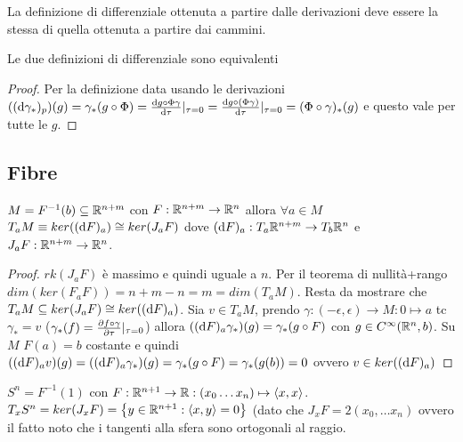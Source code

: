 La definizione di differenziale ottenuta a partire dalle
derivazioni deve essere la stessa di quella ottenuta a partire dai
cammini. 
\begin{obs}
    Le due definizioni di differenziale sono equivalenti
\end{obs}
\begin{proof}
    Per la definizione data usando le derivazioni
    $((\dd{\gamma_*})_{p})(g)=\gamma_*(g\circ\Phi)=
    \dv{g\circ\Phi\gamma}{\tau}|_{\tau=0}=
    \dv{g\circ(\Phi\gamma)}{\tau}|_{\tau=0}=(\Phi\circ\gamma)_*(g)$
    e questo vale per tutte le $g$.
\end{proof}

\subsection{Fibre}
\begin{theorem}
    $M=F^{-1}(b)\subseteq\mathbb{R}^{n+m}$ con $F:\mathbb{R}^{n+m}\to\mathbb{R}^n$ allora
    $\forall a\in M$ $T_aM\equiv ker((\dd{F})_{a})\cong ker(J_aF)$
    dove $(\dd{F})_{a}:T_a\mathbb{R}^{n+m}\to T_b\mathbb{R}^n$ e
    $J_aF:\mathbb{R}^{n+m}\to\mathbb{R}^n$.
\end{theorem}
\begin{proof}
    $rk(J_aF)$ è massimo e quindi uguale a $n$. Per il teorema di
    nullità+rango $dim(ker(F_aF))=n+m-n=m=dim(T_aM)$. Resta da
    mostrare che $T_aM\subseteq ker(J_aF)\cong ker((\dd{F})_{a})$.
    Sia $v\in T_aM$, prendo $\gamma:(-\epsilon,\epsilon)\to
    M:0\mapsto a$ tc $\gamma_*=v$
    ($\gamma_*(f)=\pdv{f\circ\gamma}{\tau}|_{\tau=0}$) allora 
    $((\dd{F})_{a}\gamma_*)(g)=\gamma_*(g\circ F)$ con $g\in
    C^\infty(\mathbb{R}^n,b)$. Su $M$ $F(a)=b$ costante e quindi
    $((\dd{F})_{a}v)(g)=((\dd{F})_{a}\gamma_*)(g)=\gamma_*(g\circ
    F)=\gamma_*(g(b))=0$ ovvero $v\in ker((\dd{F})_{a})$

    
\end{proof}

\begin{ex}
    $S^n=F^{-1}(1)$ con $F:\mathbb{R}^{n+1}\to\mathbb{R}:(x_0\dots
    x_n)\mapsto\langle x,x\rangle$.
    $T_xS^n=ker(J_xF)=\left\{ y\in\mathbb{R}^{n+1}:\langle x,y\rangle=0
    \right\}$ (dato che $J_xF=2(x_0,\dots x_n)$ ovvero il fatto
    noto che i tangenti alla sfera sono ortogonali al raggio.
\end{ex}


